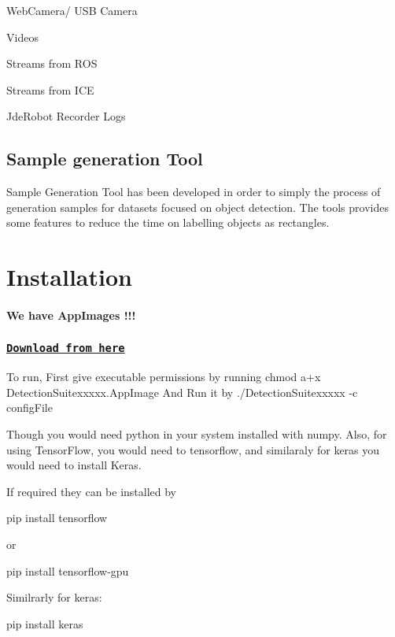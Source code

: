 \begin{DoxyItemize}
\item Web\+Camera/ U\+SB Camera
\item Videos
\item Streams from R\+OS
\item Streams from I\+CE
\item Jde\+Robot Recorder Logs
\end{DoxyItemize}

\subsection*{Sample generation Tool}

Sample Generation Tool has been developed in order to simply the process of generation samples for datasets focused on object detection. The tools provides some features to reduce the time on labelling objects as rectangles.

\section*{Installation}

\paragraph*{We have App\+Images !!!}

\subsubsection*{\href{https://github.com/vinay0410/dl-DetectionSuite/releases/tag/continuous}{\tt Download from here}}

To run, First give executable permissions by running {\ttfamily chmod a+x Detection\+Suitexxxxx.\+App\+Image} And Run it by {\ttfamily ./\+Detection\+Suitexxxxx -\/c config\+File}

Though you would need {\ttfamily python} in your system installed with {\ttfamily numpy}. Also, for using Tensor\+Flow, you would need to tensorflow, and similaraly for keras you would need to install Keras.

If required they can be installed by 
\begin{DoxyCode}
pip install tensorflow
\end{DoxyCode}
 or


\begin{DoxyCode}
pip install tensorflow-gpu
\end{DoxyCode}
 Similrarly for keras\+: 
\begin{DoxyCode}
pip install keras
\end{DoxyCode}


